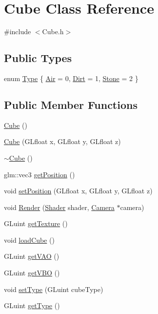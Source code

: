 \hypertarget{class_cube}{}\section{Cube Class Reference}
\label{class_cube}


{\ttfamily \#include $<$Cube.\+h$>$}

\subsection*{Public Types}
\begin{DoxyCompactItemize}
\item 
enum \hyperlink{class_cube_aa23329b4c4998aa957e44b6a44b9bfcf}{Type} \{ \hyperlink{class_cube_aa23329b4c4998aa957e44b6a44b9bfcfa96d073bf026e7fda861a7abe6b06df48}{Air} = 0, 
\hyperlink{class_cube_aa23329b4c4998aa957e44b6a44b9bfcfa39debf286eddf291013f7956e2e241ce}{Dirt} = 1, 
\hyperlink{class_cube_aa23329b4c4998aa957e44b6a44b9bfcfad77c682c3ef00d11319a1bed70ff9556}{Stone} = 2
 \}
\end{DoxyCompactItemize}
\subsection*{Public Member Functions}
\begin{DoxyCompactItemize}
\item 
\hyperlink{class_cube_a06f3d86fb63e3aad08623610aa3c17b4}{Cube} ()
\item 
\hyperlink{class_cube_a8523687590ff90c49bc54281d0d3e47a}{Cube} (G\+Lfloat x, G\+Lfloat y, G\+Lfloat z)
\item 
\hyperlink{class_cube_aa814e979cecb8c451fdb332ded2cea1e}{$\sim$\+Cube} ()
\item 
glm\+::vec3 \hyperlink{class_cube_ae55713af649b1cc24426d2ca209b8163}{get\+Position} ()
\item 
void \hyperlink{class_cube_a6940368c7d15292b4bccdf3ffc67ec93}{set\+Position} (G\+Lfloat x, G\+Lfloat y, G\+Lfloat z)
\item 
void \hyperlink{class_cube_aeeeccb9eb5da6e9d8114be298742cf00}{Render} (\hyperlink{class_shader}{Shader} shader, \hyperlink{class_camera}{Camera} $\ast$camera)
\item 
G\+Luint \hyperlink{class_cube_a92ef19e9427e3d4f098d575db03757c6}{get\+Texture} ()
\item 
void \hyperlink{class_cube_a13e5899692dffbb09019809d2998f71a}{load\+Cube} ()
\item 
G\+Luint \hyperlink{class_cube_af4f3394054081c69c8f4f9c2a6b9ba54}{get\+V\+A\+O} ()
\item 
G\+Luint \hyperlink{class_cube_aec756e9d5ff559a226ce52a300688508}{get\+V\+B\+O} ()
\item 
void \hyperlink{class_cube_ab68cedd92c926506f50f06ae57761ae7}{set\+Type} (G\+Luint cube\+Type)
\item 
G\+Luint \hyperlink{class_cube_a27aea823ea0926b6fb9315ae9cfac5bb}{get\+Type} ()
\end{DoxyCompactItemize}


